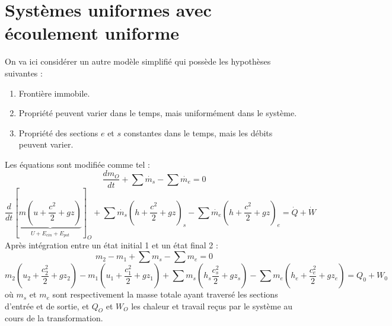 \section{Systèmes uniformes avec écoulement uniforme}
On va ici considérer un autre modèle simplifié qui possède les hypothèses 
suivantes :
\begin{enumerate}
\item Frontière immobile.
\item Propriété peuvent varier dans le temps, mais uniformément dans le 
système.
\item Propriété des sections $e$ et $s$ constantes dans le temps, mais les 
débits peuvent varier.
\end{enumerate}
Les équations sont modifiée comme tel :
\begin{equation}
\frac{dm_O}{dt} + \sum \dot{m_s}-\sum \dot{m_e}=0
\end{equation}
\begin{equation}
\frac{d}{dt}\left[\underbrace{m\left(u+\frac{c^2}{2}+gz\right)}_{U+E_{cin}+
E_{pot}}\right]_O + \sum\dot{m_s}\left(h+\frac{c^2}{2}+gz\right)_s-
\sum\dot{m_e}\left(h+\frac{c^2}{2}+gz\right)_e = \dot{Q}+\dot{W}
\end{equation}
Après intégration entre un état initial 1 et un état final 2 : 
\begin{equation}
m_2-m_1 + \sum m_s - \sum m_e = 0
\end{equation}
\begin{equation}
m_2\left(u_2+\frac{c_2^2}{2}+gz_2\right)-m_1\left(u_1+\frac{c_1^2}{2}+gz_1
\right)+\sum m_s\left(h_s\frac{c_s^2}{2}+gz_s\right)-\sum m_e\left(h_e+\frac{
c_e^2}{2}+gz_e\right) = Q_0+W_0
\end{equation}
où $m_s$ et $m_e$ sont respectivement la masse totale ayant traversé les sections
d’entrée et de sortie, et $Q_O$ et $W_O$ les chaleur et travail reçus par le système au
cours de la transformation.












